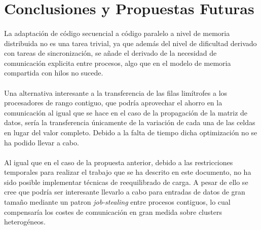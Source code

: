 \documentclass[10pt, a4paper,spanish]{article}
\begin{document}
	\section{Conclusiones y Propuestas Futuras}

		\paragraph{}
		La adaptación de código secuencial a código paralelo a nivel de memoria distribuida no es una tarea trivial, ya que además del nivel de dificultad derivado con tareas de sincronización, se añade el derivado de la necesidad de comunicación explicita entre procesos, algo que en el modelo de memoria compartida con hilos no sucede.

		\paragraph{}
		Una alternativa interesante a la transferencia de las filas limítrofes a los procesadores de rango contiguo, que podría aprovechar el ahorro en la comunicación al igual que se hace en el caso de la propagación de la matriz de datos, sería la transferencia únicamente de la variación de cada una de las celdas en lugar del valor completo. Debido a la falta de tiempo dicha optimización no se ha podido llevar a cabo.

		\paragraph{}
		Al igual que en el caso de la propuesta anterior, debido a las restricciones temporales para realizar el trabajo que se ha descrito en este documento, no ha sido posible implementar técnicas de reequilibrado de carga. A pesar de ello se cree que podría ser interesante llevarlo a cabo para entradas de datos de gran tamaño mediante un patron \emph{job-stealing} entre procesos contiguos, lo cual compensaría los costes de comunicación en gran medida sobre clusters heterogéneos.

	\nocite{subject:cp}
  
  
\end{document}
